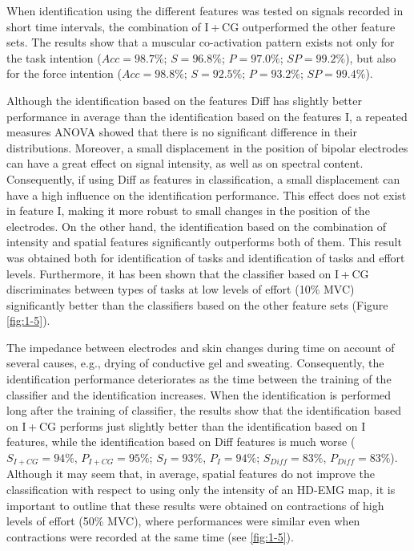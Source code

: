 When identification using the different features was tested on signals recorded in short time intervals, the combination of I + CG outperformed the other feature sets. The results show that a muscular co-activation pattern exists not only for the task intention ($Acc = 98.7\%$; $S = 96.8\%$; $P = 97.0\%$; $SP = 99.2\%$), but also for the force intention ($Acc = 98.8\%$; $S = 92.5\%$; $P = 93.2\%$; $SP = 99.4\%$).

Although the identification based on the features Diff has slightly better performance in average than the identification based on the features I, a repeated measures ANOVA showed that there is no significant difference in their distributions. Moreover, a small displacement in the position of bipolar electrodes can have a great effect on signal intensity, as well as on spectral content. Consequently, if using Diff as features in classification, a small displacement can have a high influence on the identification performance. This effect does not exist in feature I, making it more robust to small changes in the position of the electrodes. On the other hand, the identification based on the combination of intensity and spatial features significantly outperforms both of them. This result was obtained both for identification of tasks and identification of tasks and effort levels. Furthermore, it has been shown that the classifier based on I + CG discriminates between types of tasks at low levels of effort (10\% MVC) significantly better than the classifiers based on the other feature sets (Figure \ref{fig:1-5}).

The impedance between electrodes and skin changes during time on account of several causes, e.g., drying of conductive gel and sweating. Consequently, the identification performance deteriorates as the time between the training of the classifier and the identification increases. When the identification is performed long after the training of classifier, the results show that the identification based on I + CG performs just slightly better than the identification based on I features, while the identification based on Diff features is much worse ($S_{I+CG} = 94\%$, $P_{I+CG} = 95\%$; $S_I = 93\%$, $P_I = 94\%$; $S_{Diff} = 83\%$, $P_{Diff} = 83\%$). Although it may seem that, in average, spatial features do not improve the classification with respect to using only the intensity of an HD-EMG map, it is important to outline that these results were obtained on contractions of high levels of effort (50\% MVC), where performances were similar even when contractions were recorded at the same time (see \ref{fig:1-5}).

